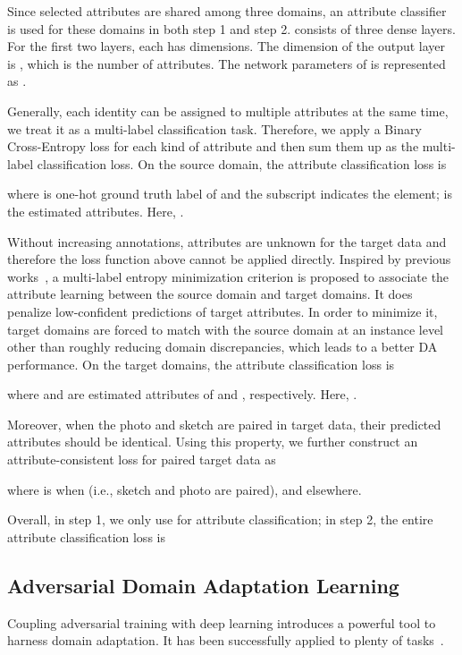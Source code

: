 \documentclass[journal]{IEEEtran}
\begin{document}
Since selected attributes are shared among three domains, an attribute classifier  is used for these domains in both step 1 and step 2.  consists of three dense layers. For the first two layers, each has  dimensions. The dimension of the output layer is , which is the number of attributes. The network parameters of  is represented as .

Generally, each identity can be assigned to multiple attributes at the same time, we treat it as a multi-label classification task. Therefore, we apply a Binary Cross-Entropy loss for each kind of attribute and then sum them up as the multi-label classification loss. On the source domain, the attribute classification loss is 

where  is one-hot ground truth label of  and the subscript  indicates the  element;  is the estimated attributes. Here, .

Without increasing annotations, attributes are unknown for the target data and therefore the loss function above cannot be applied directly. Inspired by previous works~\cite{luo2017label,shu2019transferable,zou2019consensus, saito2019semi}, a multi-label entropy minimization criterion is proposed to associate the attribute learning between the source domain and target domains. It does penalize low-confident predictions of target attributes. In order to minimize it, target domains are forced to match with the source domain at an instance level other than roughly reducing domain discrepancies, which leads to a better DA performance. On the target domains, the attribute classification loss is  

where  and  are estimated attributes of  and , respectively. Here, .


Moreover, when the photo and sketch are paired in target data, their predicted attributes should be identical. Using this property, we further construct an attribute-consistent loss for paired target data as

where  is  when  (i.e., sketch and photo are paired), and  elsewhere.
 
Overall, in step 1, we only use  for attribute classification; in step 2, the entire attribute classification loss is



\subsection{Adversarial Domain Adaptation Learning}

Coupling adversarial training with deep learning introduces a powerful tool to harness domain adaptation. It has been successfully applied to plenty of tasks~\cite{ganin2015unsupervised,wang2018deep,dai2018cross,cao2018partial,zou2019consensus}. 
\end{document}
